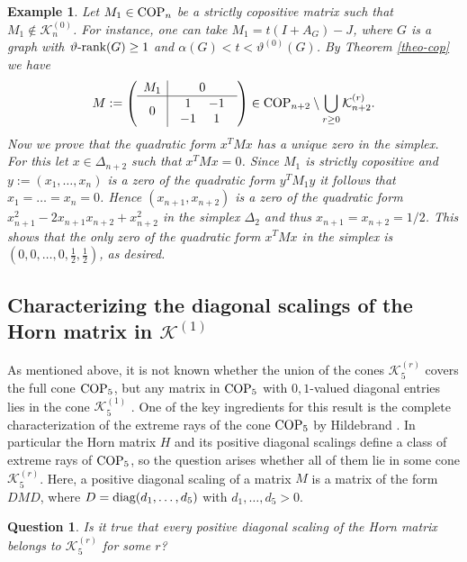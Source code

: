 \documentclass[11pt]{article}
\newtheorem{question}[theorem]{Question}
\newtheorem{example}[theorem]{Example}
\numberwithin{equation}{section}
\newcommand{\COP}{{\text{\rm COP}}}
\newcommand{\MK}{{\mathcal K}}
\newcommand{\rrank}{\vartheta\text{\rm -rank}}
\begin{document}
\begin{example}
Let  $M_1\in \COP_n$  be a strictly copositive matrix such that $M_1\not\in \MK_n^{(0)}$. For instance, one can  take $M_1=t(I+A_G)-J$, where $G$ is a graph with $\rrank(G)\ge 1$ and $\alpha(G)<t< \vartheta^{(0)}(G)$.
By Theorem \ref{theo-cop} we have 
\begin{equation}
M:=\left(
\begin{array}{c|c}
M_1 & 0\\
\hline
0 & \begin{array}{cc}
1 & -1 \\
-1 & 1
\end{array}
\end{array}
\right) \in \COP_{n+2}\setminus \bigcup_{r\ge 0}\MK_{n+2}^{(r)}.
\end{equation}
Now we prove that the quadratic form $x^TMx$ has a unique zero in the simplex. For this let $x\in \Delta_{n+2}$ such that $x^TMx=0$. Since $M_1$ is strictly copositive and $y:=(x_1,\ldots,x_n)$ is a zero of the quadratic form $y^TM_1y$ it follows that $x_1=\ldots=x_n=0$. Hence  $(x_{n+1}, x_{n+2})$ is  a zero of the quadratic form $x_{n+1}^2 - 2x_{n+1}x_{n+2}+x_{n+2}^2$ in the simplex $\Delta_2$ and thus $x_{n+1}=x_{n+2}=1/2$. This shows that  the only zero of the quadratic form $x^TMx$ in the simplex is $(0,0,\dots, 0, \frac{1}{2},\frac{1}{2})$, as desired.
\end{example}
 
\subsection{Characterizing the diagonal scalings of the Horn matrix in $\MK^{(1)}$}\label{secscalingC5}
As mentioned above, it is not known whether the union of the cones $\MK^{(r)}_5$ covers the full cone $\COP_5$, but  any  matrix  in $\COP_5$ with $0,1$-valued diagonal entries  lies in the cone $\MK^{(1)}_5$ \cite{DDGH}. One of the key ingredients for this result is the complete characterization of the extreme rays of the cone $\COP_5$ by Hildebrand \cite{Hildebrand}. In particular the Horn matrix $H$ and its positive  diagonal scalings define a class of extreme rays of $\COP_5$, so the question arises whether all of them lie in some cone $\MK^{(r)}_5$.  Here, a positive diagonal scaling of a matrix $M$ is a matrix of the form $DMD$, where $D=\text{\rm diag}(d_1,\ldots,d_5)$ with $d_1,\ldots,d_5>0$.


 \begin{question} Is it true that  every positive diagonal scaling  of the Horn matrix belongs to  $ \MK_5^{(r)}$ for some $r$?
  \end{question} 
 
\end{document}
